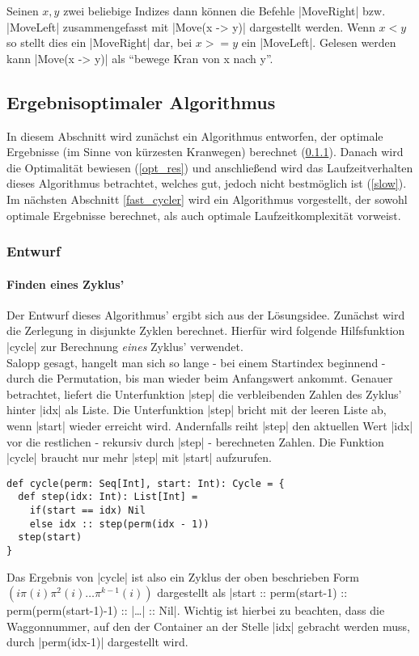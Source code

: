 Seinen $x,y$ zwei beliebige Indizes dann können die Befehle |MoveRight| bzw. |MoveLeft| zusammengefasst mit |Move(x -> y)| dargestellt werden.
Wenn $x < y$ so stellt dies ein |MoveRight| dar, bei $x >= y$ ein |MoveLeft|.
Gelesen werden kann |Move(x -> y)| als ``bewege Kran von x nach y''.

\subsection{Ergebnisoptimaler Algorithmus}
In diesem Abschnitt wird zunächst ein Algorithmus entworfen, der optimale Ergebnisse (im Sinne von kürzesten Kranwegen) berechnet (\ref{slow_cycler}).
Danach wird die Optimalität bewiesen (\ref{opt_res}) und anschließend wird das Laufzeitverhalten dieses Algorithmus betrachtet, welches gut, jedoch nicht bestmöglich ist (\ref{slow}).
Im nächsten Abschnitt \ref{fast_cycler} wird ein Algorithmus vorgestellt, der sowohl optimale Ergebnisse berechnet, als auch optimale Laufzeitkomplexität vorweist.
\subsubsection{Entwurf}
\label{slow_cycler}
\paragraph{Finden eines Zyklus'}
Der Entwurf dieses Algorithmus' ergibt sich aus der Lösungsidee. Zunächst wird die Zerlegung in disjunkte Zyklen berechnet.
Hierfür wird folgende Hilfsfunktion |cycle| zur Berechnung \emph{eines} Zyklus' verwendet.\\
Salopp gesagt, hangelt man sich so lange - bei einem Startindex beginnend - durch die Permutation, bis man wieder beim Anfangswert ankommt.
Genauer betrachtet, liefert die Unterfunktion |step| die verbleibenden Zahlen des Zyklus' hinter |idx| als Liste.
Die Unterfunktion |step| bricht mit der leeren Liste ab, wenn |start| wieder erreicht wird.
Andernfalls reiht |step| den aktuellen Wert |idx| vor die restlichen - rekursiv durch |step| - berechneten Zahlen.
Die Funktion |cycle| braucht nur mehr |step| mit |start| aufzurufen.
\lstset{basicstyle=\ttfamily}
\begin{lstlisting}
def cycle(perm: Seq[Int], start: Int): Cycle = {
  def step(idx: Int): List[Int] =
    if(start == idx) Nil
    else idx :: step(perm(idx - 1))
  step(start)
}
\end{lstlisting}
Das Ergebnis von |cycle| ist also ein Zyklus der oben beschrieben Form $(i \pi(i) \pi^2(i) \dots \pi^{k-1}(i))$ dargestellt
als |start :: perm(start-1) :: perm(perm(start-1)-1) :: |\dots| :: Nil|.
Wichtig ist hierbei zu beachten, dass die Waggonnummer, auf den der Container an der Stelle |idx| gebracht werden muss,
 durch |perm(idx-1)| dargestellt wird.
